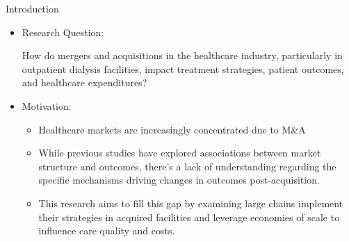 \begin{frame}{Introduction}
\begin{itemize}
    \item Research Question:
    
    How do mergers and acquisitions in the healthcare industry, particularly in outpatient dialysis facilities, impact treatment strategies, patient outcomes, and healthcare expenditures?
    \item Motivation:
    \begin{itemize}
        \item  Healthcare markets are increasingly concentrated due to M\&A
    \item While previous studies have explored associations between market structure and outcomes, there's a lack of understanding regarding the specific mechanisms driving changes in outcomes post-acquisition.
    \item This research aims to fill this gap by examining large chains implement their strategies in acquired facilities and leverage economies of scale to influence care quality and costs.
    \end{itemize}
    
\end{itemize}

\end{frame}